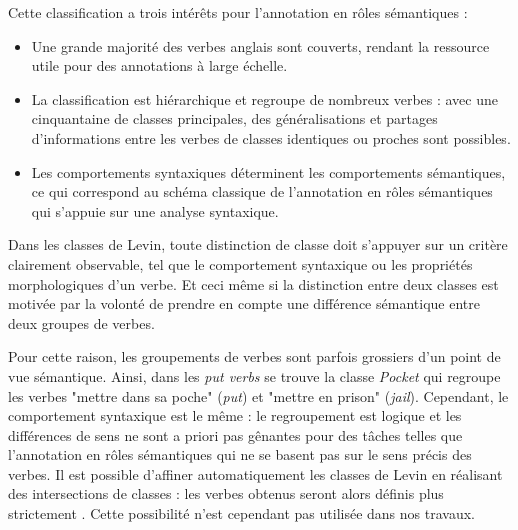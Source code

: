 Cette classification a trois intérêts pour l'annotation en rôles sémantiques :

\begin{itemize}

    \item Une grande majorité des verbes anglais sont couverts, rendant la
        ressource utile pour des annotations à large échelle.

    \item La classification est hiérarchique et regroupe de nombreux verbes :
        avec une cinquantaine de classes principales, des généralisations et
        partages d'informations entre les verbes de classes identiques ou
        proches sont possibles.

    \item Les comportements syntaxiques déterminent les comportements
        sémantiques, ce qui correspond au schéma classique de l'annotation en
        rôles sémantiques qui s'appuie sur une analyse syntaxique.

\end{itemize}



Dans les classes de Levin, toute distinction de classe doit s'appuyer sur un
critère clairement observable, tel que le comportement syntaxique ou les
propriétés morphologiques d'un verbe. Et ceci même si la distinction entre deux
classes est motivée par la volonté de prendre en compte une différence
sémantique entre deux groupes de verbes.

Pour cette raison, les groupements de verbes sont parfois grossiers d'un point
de vue sémantique. Ainsi, dans les \textit{put verbs} se trouve la classe
\textit{Pocket} qui regroupe les verbes "mettre dans sa poche" (\emph{put}) et
"mettre en prison" (\emph{jail}). Cependant, le comportement syntaxique est le
même : le regroupement est logique et les différences de sens ne sont a priori
pas gênantes pour des tâches telles que l'annotation en rôles sémantiques qui
ne se basent pas sur le sens précis des verbes. Il est possible d'affiner
automatiquement les classes de Levin en réalisant des intersections de classes
: les verbes obtenus seront alors définis plus strictement
\citep{dang1998investigating}. Cette possibilité n'est cependant pas utilisée
dans nos travaux.


